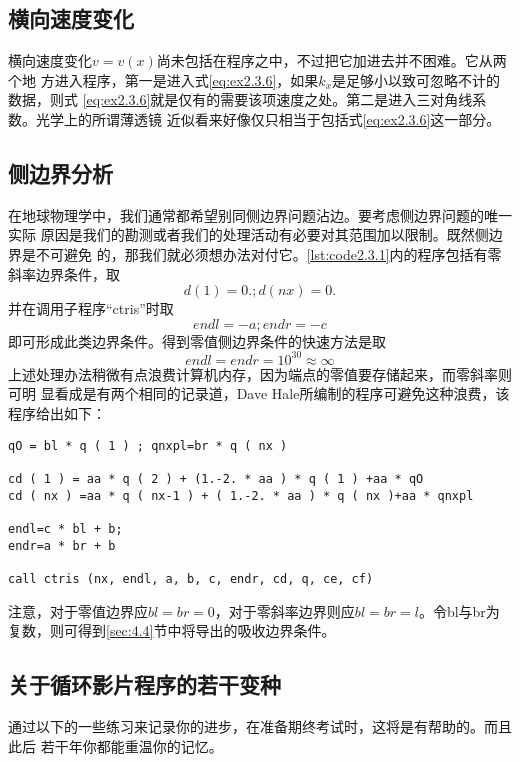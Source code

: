 \subsection{横向速度变化}
横向速度变化$v=v(x)$尚未包括在程序之中，不过把它加进去并不困难。它从两个地
方进入程序，第一是进入式\ref{eq:ex2.3.6}，如果$k_x$是足够小以致可忽略不计的数据，则式
\ref{eq:ex2.3.6}就是仅有的需要该项速度之处。第二是进入三对角线系数。光学上的所谓薄透镜
近似看来好像仅只相当于包括式\ref{eq:ex2.3.6}这一部分。

\subsection{侧边界分析}
在地球物理学中，我们通常都希望别同侧边界问题沾边。要考虑侧边界问题的唯一实际
原因是我们的勘测或者我们的处理活动有必要对其范围加以限制。既然侧边界是不可避免
的，那我们就必须想办法对付它。\ref{lst:code2.3.1}内的程序包括有零斜率边界条件，取
\begin{equation*}
d(1)=0.; d(nx)=0.
\end{equation*}
并在调用子程序“ctris”时取
\begin{equation*}
endl= -a ; endr = -c
\end{equation*}
即可形成此类边界条件。得到零值侧边界条件的快速方法是取
\begin{equation*}
endl = endr = 10^{30}\approx\infty
\end{equation*}
上述处理办法稍微有点浪费计算机内存，因为端点的零值要存储起来，而零斜率则可明
显看成是有两个相同的记录道，Dave
Hale所编制的程序可避免这种浪费，该程序给出如下：
\begin{verbatim}
qO = bl * q ( 1 ) ; qnxpl=br * q ( nx )

cd ( 1 ) = aa * q ( 2 ) + (1.-2. * aa ) * q ( 1 ) +aa * qO
cd ( nx ) =aa * q ( nx-1 ) + ( 1.-2. * aa ) * q ( nx )+aa * qnxpl

endl=c * bl + b;
endr=a * br + b

call ctris (nx, endl, a, b, c, endr, cd, q, ce, cf)
\end{verbatim}
注意，对于零值边界应$bl=br=0$，对于零斜率边界则应$bl=br=
l$。令bl与br为复数，则可得到\ref{sec:4.4}节中将导出的吸收边界条件。

\subsection{关于循环影片程序的若干变种}
通过以下的一些练习来记录你的进步，在准备期终考试时，这将是有帮助的。而且此后
若干年你都能重温你的记忆。

